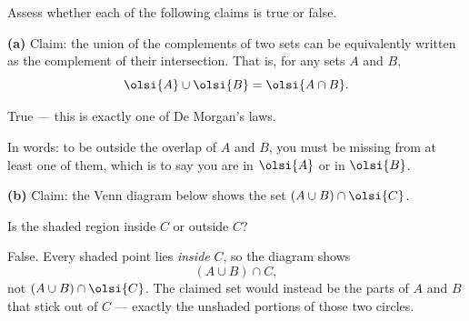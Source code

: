 \documentclass[12pt]{ximera}
\begin{document}
\begin{problem}
Assess whether each of the following claims is true or false.

\begin{prompt}
\textbf{(a)} Claim: the union of the complements of two sets can be equivalently
written as the complement of their intersection. That is, for any sets $A$ and $B$,
\[ \olsi{A}\cup \olsi{B} = \olsi{A\cap B}. \]

\begin{multipleChoice}
\end{multipleChoice}

\begin{feedback}
True --- this is exactly one of De Morgan's laws.

In words: to be outside the overlap of $A$ and $B$, you must be missing from at least
one of them, which is to say you are in $\olsi{A}$ or in $\olsi{B}$.
\end{feedback}
\end{prompt}

\begin{prompt}
\textbf{(b)} Claim: the Venn diagram below shows the set
$\left(A\cup B\right)\cap \olsi{C}$.

\begin{center}
\end{center}

\begin{multipleChoice}
\end{multipleChoice}

\begin{hint}
Is the shaded region inside $C$ or outside $C$?
\end{hint}

\begin{feedback}
False. Every shaded point lies \emph{inside} $C$, so the diagram shows
\[ \left(A\cup B\right)\cap C, \]
not $\left(A\cup B\right)\cap\olsi{C}$. The claimed set would instead be the parts of
$A$ and $B$ that stick out of $C$ --- exactly the unshaded portions of those two
circles.
\end{feedback}
\end{prompt}
\end{problem}
\end{document}
